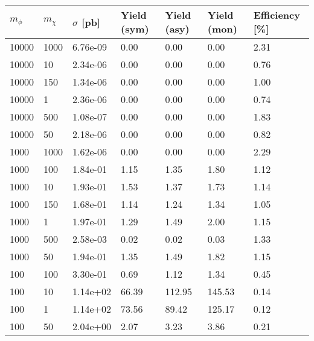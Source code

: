 \begin{table}
\small
\centering
\begin{tabular}{lllllll}
\hline
$m_\phi$ & $m_\chi$ & $\sigma$ [pb] & Yield (sym) & Yield (asy) & Yield (mon) & Efficiency [\%] \\ \hline
10000     &   1000      &   6.76e-09  &   0.00      &   0.00      &   0.00      &   2.31      \\ 
10000     &   10        &   2.34e-06  &   0.00      &   0.00      &   0.00      &   0.76      \\ 
10000     &   150       &   1.34e-06  &   0.00      &   0.00      &   0.00      &   1.00      \\ 
10000     &   1         &   2.36e-06  &   0.00      &   0.00      &   0.00      &   0.74      \\ 
10000     &   500       &   1.08e-07  &   0.00      &   0.00      &   0.00      &   1.83      \\ 
10000     &   50        &   2.18e-06  &   0.00      &   0.00      &   0.00      &   0.82      \\ 
1000      &   1000      &   1.62e-06  &   0.00      &   0.00      &   0.00      &   2.29      \\ 
1000      &   100       &   1.84e-01  &   1.15      &   1.35      &   1.80      &   1.12      \\ 
1000      &   10        &   1.93e-01  &   1.53      &   1.37      &   1.73      &   1.14      \\ 
1000      &   150       &   1.68e-01  &   1.14      &   1.24      &   1.34      &   1.05      \\ 
1000      &   1         &   1.97e-01  &   1.29      &   1.49      &   2.00      &   1.15      \\ 
1000      &   500       &   2.58e-03  &   0.02      &   0.02      &   0.03      &   1.33      \\ 
1000      &   50        &   1.94e-01  &   1.35      &   1.49      &   1.82      &   1.15      \\ 
100       &   100       &   3.30e-01  &   0.69      &   1.12      &   1.34      &   0.45      \\ 
100       &   10        &   1.14e+02  &   66.39     &   112.95    &   145.53    &   0.14      \\ 
100       &   1         &   1.14e+02  &   73.56     &   89.42     &   125.17    &   0.12      \\ 
100       &   50        &   2.04e+00  &   2.07      &   3.23      &   3.86      &   0.21      \\ 

\end{tabular}
\end{table}
